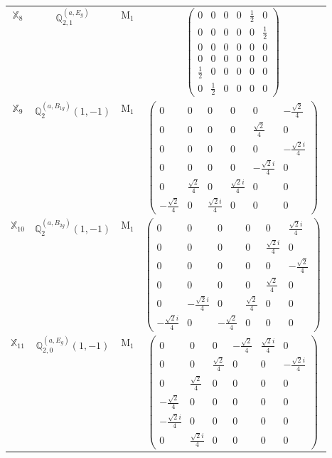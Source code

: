 \documentclass[fleqn,10pt,landscape]{article}
\begin{document}
\begin{itemize}
\begin{center}
\begin{longtable}{c|c|c|c}
$ \mathbb{X}_{8} $ & $\mathbb{Q}_{2,1}^{(a,E_{g})}$ & M$_{1}$ & $\begin{pmatrix} 0 & 0 & 0 & 0 & \frac{1}{2} & 0 \\ 0 & 0 & 0 & 0 & 0 & \frac{1}{2} \\ 0 & 0 & 0 & 0 & 0 & 0 \\ 0 & 0 & 0 & 0 & 0 & 0 \\ \frac{1}{2} & 0 & 0 & 0 & 0 & 0 \\ 0 & \frac{1}{2} & 0 & 0 & 0 & 0 \end{pmatrix}$ \\
$ \mathbb{X}_{9} $ & $\mathbb{Q}_{2}^{(a,B_{1g})}(1,-1)$ & M$_{1}$ & $\begin{pmatrix} 0 & 0 & 0 & 0 & 0 & - \frac{\sqrt{2}}{4} \\ 0 & 0 & 0 & 0 & \frac{\sqrt{2}}{4} & 0 \\ 0 & 0 & 0 & 0 & 0 & - \frac{\sqrt{2} i}{4} \\ 0 & 0 & 0 & 0 & - \frac{\sqrt{2} i}{4} & 0 \\ 0 & \frac{\sqrt{2}}{4} & 0 & \frac{\sqrt{2} i}{4} & 0 & 0 \\ - \frac{\sqrt{2}}{4} & 0 & \frac{\sqrt{2} i}{4} & 0 & 0 & 0 \end{pmatrix}$ \\
$ \mathbb{X}_{10} $ & $\mathbb{Q}_{2}^{(a,B_{2g})}(1,-1)$ & M$_{1}$ & $\begin{pmatrix} 0 & 0 & 0 & 0 & 0 & \frac{\sqrt{2} i}{4} \\ 0 & 0 & 0 & 0 & \frac{\sqrt{2} i}{4} & 0 \\ 0 & 0 & 0 & 0 & 0 & - \frac{\sqrt{2}}{4} \\ 0 & 0 & 0 & 0 & \frac{\sqrt{2}}{4} & 0 \\ 0 & - \frac{\sqrt{2} i}{4} & 0 & \frac{\sqrt{2}}{4} & 0 & 0 \\ - \frac{\sqrt{2} i}{4} & 0 & - \frac{\sqrt{2}}{4} & 0 & 0 & 0 \end{pmatrix}$ \\
$ \mathbb{X}_{11} $ & $\mathbb{Q}_{2,0}^{(a,E_{g})}(1,-1)$ & M$_{1}$ & $\begin{pmatrix} 0 & 0 & 0 & - \frac{\sqrt{2}}{4} & \frac{\sqrt{2} i}{4} & 0 \\ 0 & 0 & \frac{\sqrt{2}}{4} & 0 & 0 & - \frac{\sqrt{2} i}{4} \\ 0 & \frac{\sqrt{2}}{4} & 0 & 0 & 0 & 0 \\ - \frac{\sqrt{2}}{4} & 0 & 0 & 0 & 0 & 0 \\ - \frac{\sqrt{2} i}{4} & 0 & 0 & 0 & 0 & 0 \\ 0 & \frac{\sqrt{2} i}{4} & 0 & 0 & 0 & 0 \end{pmatrix}$ \\

\end{longtable}
\end{center}
\end{itemize}
\end{document}
